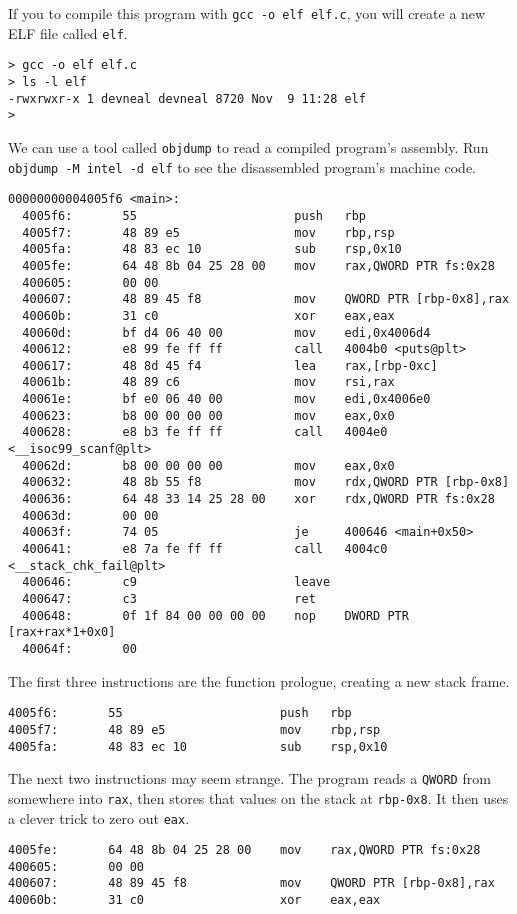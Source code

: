 If you to compile this program with \texttt{gcc -o elf elf.c}, you will create
a new ELF file called \texttt{elf}.

\begin{lstlisting}
> gcc -o elf elf.c 
> ls -l elf
-rwxrwxr-x 1 devneal devneal 8720 Nov  9 11:28 elf
> 
\end{lstlisting}

We can use a tool called \texttt{objdump} to read a compiled program's assembly.
Run \texttt{objdump -M intel -d elf} to see the disassembled program's machine
code.

\begin{lstlisting}
00000000004005f6 <main>:
  4005f6:       55                      push   rbp
  4005f7:       48 89 e5                mov    rbp,rsp
  4005fa:       48 83 ec 10             sub    rsp,0x10
  4005fe:       64 48 8b 04 25 28 00    mov    rax,QWORD PTR fs:0x28
  400605:       00 00 
  400607:       48 89 45 f8             mov    QWORD PTR [rbp-0x8],rax
  40060b:       31 c0                   xor    eax,eax
  40060d:       bf d4 06 40 00          mov    edi,0x4006d4
  400612:       e8 99 fe ff ff          call   4004b0 <puts@plt>
  400617:       48 8d 45 f4             lea    rax,[rbp-0xc]
  40061b:       48 89 c6                mov    rsi,rax
  40061e:       bf e0 06 40 00          mov    edi,0x4006e0
  400623:       b8 00 00 00 00          mov    eax,0x0
  400628:       e8 b3 fe ff ff          call   4004e0 <__isoc99_scanf@plt>
  40062d:       b8 00 00 00 00          mov    eax,0x0
  400632:       48 8b 55 f8             mov    rdx,QWORD PTR [rbp-0x8]
  400636:       64 48 33 14 25 28 00    xor    rdx,QWORD PTR fs:0x28
  40063d:       00 00 
  40063f:       74 05                   je     400646 <main+0x50>
  400641:       e8 7a fe ff ff          call   4004c0 <__stack_chk_fail@plt>
  400646:       c9                      leave  
  400647:       c3                      ret    
  400648:       0f 1f 84 00 00 00 00    nop    DWORD PTR [rax+rax*1+0x0]
  40064f:       00
\end{lstlisting}

The first three instructions are the function prologue, creating a new stack
frame.
\begin{lstlisting}
4005f6:       55                      push   rbp
4005f7:       48 89 e5                mov    rbp,rsp
4005fa:       48 83 ec 10             sub    rsp,0x10
\end{lstlisting}

The next two instructions may seem strange. The program reads a \texttt{QWORD}
from somewhere into \texttt{rax}, then stores that values on the stack at
\texttt{rbp-0x8}. It then uses a clever trick to zero out \texttt{eax}.
\begin{lstlisting}
4005fe:       64 48 8b 04 25 28 00    mov    rax,QWORD PTR fs:0x28
400605:       00 00 
400607:       48 89 45 f8             mov    QWORD PTR [rbp-0x8],rax
40060b:       31 c0                   xor    eax,eax
\end{lstlisting}

